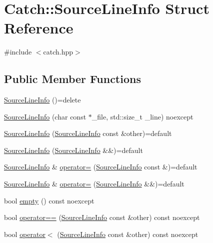 \hypertarget{struct_catch_1_1_source_line_info}{}\section{Catch\+:\+:Source\+Line\+Info Struct Reference}
\label{struct_catch_1_1_source_line_info}


{\ttfamily \#include $<$catch.\+hpp$>$}

\subsection*{Public Member Functions}
\begin{DoxyCompactItemize}
\item 
\mbox{\hyperlink{struct_catch_1_1_source_line_info_a2d80932bb4129b1606d1924a5c44be2f}{Source\+Line\+Info}} ()=delete
\item 
\mbox{\hyperlink{struct_catch_1_1_source_line_info_a48510b82a39a042ab370ed143dd30c10}{Source\+Line\+Info}} (char const $\ast$\+\_\+file, std\+::size\+\_\+t \+\_\+line) noexcept
\item 
\mbox{\hyperlink{struct_catch_1_1_source_line_info_a7c44c9986c33a9cf842b791374332d41}{Source\+Line\+Info}} (\mbox{\hyperlink{struct_catch_1_1_source_line_info}{Source\+Line\+Info}} const \&other)=default
\item 
\mbox{\hyperlink{struct_catch_1_1_source_line_info_a6614b503b493bbdd3b49a1bd732e0a55}{Source\+Line\+Info}} (\mbox{\hyperlink{struct_catch_1_1_source_line_info}{Source\+Line\+Info}} \&\&)=default
\item 
\mbox{\hyperlink{struct_catch_1_1_source_line_info}{Source\+Line\+Info}} \& \mbox{\hyperlink{struct_catch_1_1_source_line_info_a1a6cfc0197357ef4e329bb256aa8a354}{operator=}} (\mbox{\hyperlink{struct_catch_1_1_source_line_info}{Source\+Line\+Info}} const \&)=default
\item 
\mbox{\hyperlink{struct_catch_1_1_source_line_info}{Source\+Line\+Info}} \& \mbox{\hyperlink{struct_catch_1_1_source_line_info_a7fa35372f2bca5e91adc25327b7c753c}{operator=}} (\mbox{\hyperlink{struct_catch_1_1_source_line_info}{Source\+Line\+Info}} \&\&)=default
\item 
bool \mbox{\hyperlink{struct_catch_1_1_source_line_info_a10a5b5b7dff82971879c2eb8d83f9b3b}{empty}} () const noexcept
\item 
bool \mbox{\hyperlink{struct_catch_1_1_source_line_info_af07e4fdeddf8409b91e4f842f6264cf8}{operator==}} (\mbox{\hyperlink{struct_catch_1_1_source_line_info}{Source\+Line\+Info}} const \&other) const noexcept
\item 
bool \mbox{\hyperlink{struct_catch_1_1_source_line_info_af77415416919d2d6030b4be085b92f7a}{operator$<$}} (\mbox{\hyperlink{struct_catch_1_1_source_line_info}{Source\+Line\+Info}} const \&other) const noexcept
\end{DoxyCompactItemize}
